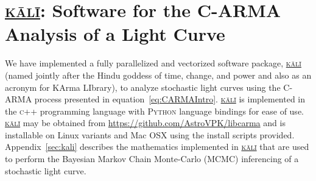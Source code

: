 \documentclass[a4paper,fleqn,usenatbib]{mnras}
\begin{document}



\section[\href{https://github.com/AstroVPK/kali}{\textsc{k\={a}l\={i}}}]{\href{https://github.com/AstroVPK/kali}{\textsc{k\={a}l\={i}}}: Software for the C-ARMA Analysis of a Light Curve}\label{sec:Steps}

We have implemented a fully parallelized and vectorized software package, \href{https://github.com/AstroVPK/kali}{\textsc{k\={a}l\={i}}} (named jointly after the Hindu goddess of time, change, and power and also as an acronym for KArma LIbrary), to analyze stochastic light curves using the C-ARMA process presented in equation~\eqref{eq:CARMAIntro}. \href{https://github.com/AstroVPK/kali}{\textsc{k\={a}l\={i}}} is implemented in the \textsc{c++} programming language with \textsc{Python} language bindings for ease of use. \href{https://github.com/AstroVPK/kali}{\textsc{k\={a}l\={i}}} may be obtained from \url{https://github.com/AstroVPK/libcarma} and is installable on Linux variants and Mac OSX using the install scripts provided. Appendix~\ref{sec:kali} describes the mathematics implemented in \href{https://github.com/AstroVPK/kali}{\textsc{k\={a}l\={i}}} that are used to perform the Bayesian Markov Chain Monte-Carlo (MCMC) inferencing of a stochastic light curve.
\end{document}
